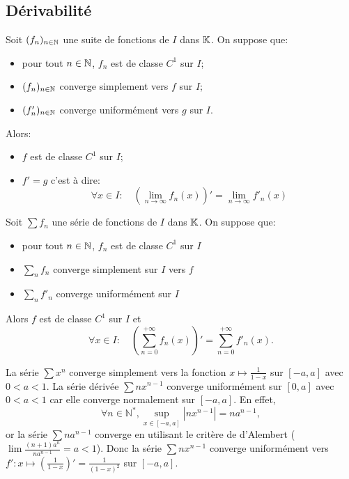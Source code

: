 \documentclass{book}
\newcommand{\fn}{(f_n)_{n\in \N   }}
\newcommand{\Sfn}{\sum f_n}
\begin{document}
\subsection{Dérivabilité}\label{sec:deriv}
%
\begin{Theoreme}
Soit $\fn$ une suite de fonctions de $I$ dans $\mathbb{K}  $.
On suppose que:
\begin{itemize}
\item
  pour tout $n\in \mathbb{N}   $, $f_n$ est de classe $C^1$ sur $I$;
\item
  $\fn$ converge simplement vers $f$ sur $I$;
\item
  $(f'_n)_{n\in\mathbb{N}}$ converge uniformément vers $g$ sur $I$.
\end{itemize}
Alors:
\begin{itemize}
\item
  $f$ est de classe $C^1$ sur $I$;
\item
  $f' = g$ c'est à dire:
$$\forall x \in I:\quad  \left(\lim\limits_{n \to \infty} f_n(x) \right)'=\lim\limits_{n \to \infty} f'_n(x)$$
  
  
\end{itemize}
\end{Theoreme}
\begin{Theoreme}
Soit $\Sfn$ une série de fonctions de $I$ dans $\mathbb{K}  $. On suppose que:
\begin{itemize}
\item
  pour tout $n\in \mathbb{N}   $, $f_n$ est de classe $C^1$ sur $I$
\item
  $\sum _n f_n$ converge simplement sur $I$ vers $f$
\item
  $\sum _n f'_n$ converge uniformément sur $I$
\end{itemize}

Alors $f$ est de classe $C^1$ sur $I$ et
\[ \forall  x\in I :\quad \left(\sum _{n=0}^{+\infty } f_n(x)\right)' = \sum _{n=0}^{+\infty } f'_n(x). \]
\end{Theoreme}
%
\begin{Exemple} La série $\sum x^n$ converge simplement vers la fonction $x\mapsto \frac{1}{1-x}$ sur $[-a,a]$ avec $0<a<1$.
La série dérivée $\sum n x^{n-1}$ converge uniformément sur $[0,a]$ avec $0<a<1$ car elle converge normalement sur  $[-a,a]$. En effet,
$$ \forall n\in \mathbb{N}^*, \sup_{x\in[-a,a]} |n x^{n-1}|=n a^{n-1},$$ 
or la série $\sum n a^{n-1}$ converge en utilisant le critère de d'Alembert ($\lim \frac{(n+1)a^{n}}{n a^{n-1}}=a<1$). Donc la série  $\sum n x^{n-1}$ converge uniformément vers $f':x\mapsto \left(\frac{1}{1-x}\right)'=\frac{1}{(1-x)^2}$ sur $[-a,a]$. 
\end{Exemple}
%
\end{document}
